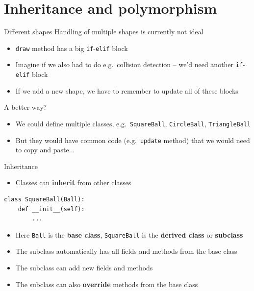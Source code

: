 \part{Inheritance and polymorphism}
\frame{\partpage}

\begin{frame}[fragile]{Different shapes}
	\pause Handling of multiple shapes is currently not ideal
	\begin{itemize}
		\pause\item \lstinline{draw} method has a big \lstinline{if}-\lstinline{elif} block
		\pause\item Imagine if we also had to do e.g.\ collision detection -- we'd need another \lstinline{if}-\lstinline{elif} block
		\pause\item If we add a new shape, we have to remember to update all of these blocks
	\end{itemize}
\end{frame}

\begin{frame}{A better way?}
	\begin{itemize}
		\pause\item We could define multiple classes, e.g.\ \lstinline{SquareBall}, \lstinline{CircleBall}, \lstinline{TriangleBall}
		\pause\item But they would have common code (e.g.\ \lstinline{update} method) that we would need to copy and paste...
	\end{itemize}
\end{frame}

\begin{frame}[fragile]{Inheritance}
	\begin{itemize}
		\pause\item Classes can \textbf{inherit} from other classes
	\end{itemize}
	\begin{lstlisting}
class SquareBall(Ball):
	def __init__(self):
		...
	\end{lstlisting}
	\begin{itemize}
		\pause\item Here \lstinline{Ball} is the \textbf{base class}, \lstinline{SquareBall} is the \textbf{derived class} or \textbf{subclass}
		\pause\item The subclass automatically has all fields and methods from the base class
		\pause\item The subclass can add new fields and methods
		\pause\item The subclass can also \textbf{override} methods from the base class
	\end{itemize}
\end{frame}

